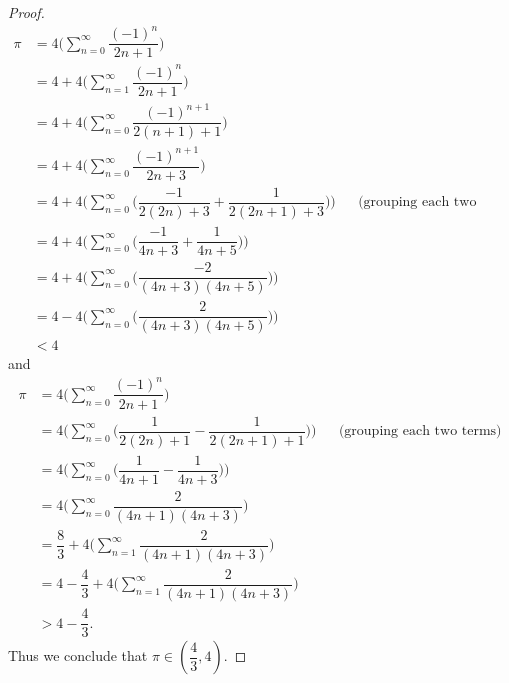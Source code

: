 \begin{proof}
\begin{align*}
    \pi & = 4 \bigg(\sum_{n = 0}^\infty \dfrac{(-1)^n}{2n + 1}\bigg)                                                                                 \\
        & = 4 + 4 \bigg(\sum_{n = 1}^\infty \dfrac{(-1)^n}{2n + 1}\bigg)                                                                             \\
        & = 4 + 4 \bigg(\sum_{n = 0}^\infty \dfrac{(-1)^{n + 1}}{2(n + 1) + 1}\bigg)                                                                 \\
        & = 4 + 4 \bigg(\sum_{n = 0}^\infty \dfrac{(-1)^{n + 1}}{2n + 3}\bigg)                                                                       \\
        & = 4 + 4 \Bigg(\sum_{n = 0}^\infty \bigg(\dfrac{-1}{2(2n) + 3} + \dfrac{1}{2(2n + 1) + 3}\bigg)\Bigg) &  & \text{(grouping each two terms)} \\
        & = 4 + 4 \Bigg(\sum_{n = 0}^\infty \bigg(\dfrac{-1}{4n + 3} + \dfrac{1}{4n + 5}\bigg)\Bigg)                                                 \\
        & = 4 + 4 \Bigg(\sum_{n = 0}^\infty \bigg(\dfrac{-2}{(4n + 3)(4n + 5)}\bigg)\Bigg)                                                           \\
        & = 4 - 4 \Bigg(\sum_{n = 0}^\infty \bigg(\dfrac{2}{(4n + 3)(4n + 5)}\bigg)\Bigg)                                                            \\
        & < 4
  \end{align*}
  and
  \begin{align*}
    \pi & = 4 \bigg(\sum_{n = 0}^\infty \dfrac{(-1)^n}{2n + 1}\bigg)                                                                            \\
        & = 4 \Bigg(\sum_{n = 0}^\infty \bigg(\dfrac{1}{2(2n) + 1} - \dfrac{1}{2(2n + 1) + 1}\bigg)\Bigg) &  & \text{(grouping each two terms)} \\
        & = 4 \Bigg(\sum_{n = 0}^\infty \bigg(\dfrac{1}{4n + 1} - \dfrac{1}{4n + 3}\bigg)\Bigg)                                                 \\
        & = 4 \bigg(\sum_{n = 0}^\infty \dfrac{2}{(4n + 1)(4n + 3)}\bigg)                                                                       \\
        & = \dfrac{8}{3} + 4 \bigg(\sum_{n = 1}^\infty \dfrac{2}{(4n + 1)(4n + 3)}\bigg)                                                        \\
        & = 4 - \dfrac{4}{3} + 4 \bigg(\sum_{n = 1}^\infty \dfrac{2}{(4n + 1)(4n + 3)}\bigg)                                                    \\
        & > 4 - \dfrac{4}{3}.
  \end{align*}
  Thus we conclude that \(\pi \in (\dfrac{4}{3}, 4)\).
\end{proof}

